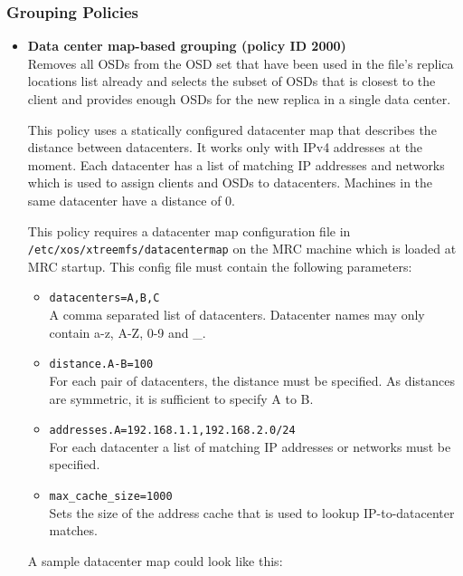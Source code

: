 \documentclass[a4paper,10pt]{book}
\begin{document}
\subsubsection{Grouping Policies}

\begin{itemize}

 \item \textbf{Data center map-based grouping (policy ID 2000)}\\
 Removes all OSDs from the OSD set that have been used in the file's replica locations list already and selects the subset of OSDs that is closest to the client and provides enough OSDs for the new replica in a single data center.

 This policy uses a statically configured datacenter map that describes the distance between datacenters. It works only with IPv4 addresses at the moment. Each datacenter has a list of matching IP addresses and networks which is used to assign clients and OSDs to datacenters. Machines in the same datacenter have a distance of 0.

	This policy requires a datacenter map configuration file in\\
	\texttt{/etc/xos/xtreemfs/datacentermap} on the MRC machine which is loaded at MRC startup. This config file must contain the following parameters:
	\begin{itemize}
		\item \texttt{datacenters=A,B,C}\\
			A comma separated list of datacenters. Datacenter names may only contain a-z, A-Z, 0-9 and \_.

		\item \texttt{distance.A-B=100}\\
			For each pair of datacenters, the distance must be specified. As distances are symmetric, it is sufficient to specify A to B.

		\item \texttt{addresses.A=192.168.1.1,192.168.2.0/24}\\
			For each datacenter a list of matching IP addresses or networks must be specified.

		\item \texttt{max\_cache\_size=1000}\\
			Sets the size of the address cache that is used to lookup IP-to-datacenter matches.
	\end{itemize}

	A sample datacenter map could look like this:


\end{itemize}
\end{document}
